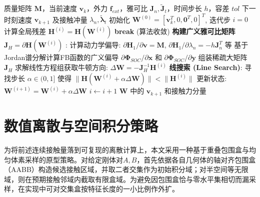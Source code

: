 ﻿\documentclass[12pt, a4paper]{ctexart}
\theoremstyle{plain}
\theoremstyle{remark}
\begin{document}
\begin{algorithm}[H]
\caption{接触动力学系统的半光滑牛顿求解算法 (SSN for SOCCP)}
\label{alg:ssn}
\begin{algorithmic}[1]
\Require 质量矩阵 $\bm{M}$，当前速度 $\bm{v}_k$，外力 $\bm{f}_{ext}$，雅可比 $\bm{J}_n, \tilde{\bm{J}}_t$，时间步长 $h$，容差 $tol$
\Ensure 下一时刻速度 $\bm{v}_{k+1}$ 及接触冲量 $\lambda_n, \tilde{\bm{\lambda}}_t$
\State 初始化 $\bm{W}^{(0)} = [\bm{v}_k^T, 0, \bm{0}^T, 0]^T$, 迭代步 $i = 0$
    \State 计算全局残差 $\bm{H}^{(i)} = \bm{H}(\bm{W}^{(i)})$
        \State \textbf{break} (算法收敛)
    \EndIf
    \State \textbf{构建广义雅可比矩阵} $\bm{J}_H = \partial \bm{H}(\bm{W}^{(i)})$ :
    \State \quad 计算动力学偏导: $\partial \bm{H}_1 / \partial \bm{v} = \bm{M}$, $\partial \bm{H}_1 / \partial \lambda_n = -h \bm{J}_n^T$ 等
    \State \quad 基于Jordan谱分解计算FB函数的广义偏导 $\partial \bm{\Phi}_{SOC} / \partial \bm{x}$ 和 $\partial \bm{\Phi}_{SOC} / \partial \bm{y}$
    \State \quad 组装稀疏大矩阵 $\bm{J}_H$
    \State 求解线性方程组获取牛顿方向: $\Delta \bm{W} = - \bm{J}_H^{-1} \bm{H}^{(i)}$
    \State \textbf{线搜索 (Line Search)}: 寻找步长 $\alpha \in (0, 1]$ 使得 $\| \bm{H}(\bm{W}^{(i)} + \alpha \Delta \bm{W}) \| < \| \bm{H}^{(i)} \|$
    \State 更新状态: $\bm{W}^{(i+1)} = \bm{W}^{(i)} + \alpha \Delta \bm{W}$
    \State $i \gets i + 1$
\EndWhile
\State \Return $\bm{W}$ 中的 $\bm{v}_{k+1}$ 和接触力分量
\end{algorithmic}
\end{algorithm}

\section{数值离散与空间积分策略}
为将前述连续接触量落到可复现的离散计算上，本文采用一种基于重叠包围盒与均匀体素采样的原型策略。对给定刚体对$A,B$，首先依据各自几何体的轴对齐包围盒（AABB）构造候选接触区域，并取二者交集作为初始积分域；对半空间等无限域，则在预期接触邻域内截取有限盒域。为避免因包围盒恰与零水平集相切而漏采样，在实现中可对交集盒按特征长度的一小比例作外扩。
\end{document}
